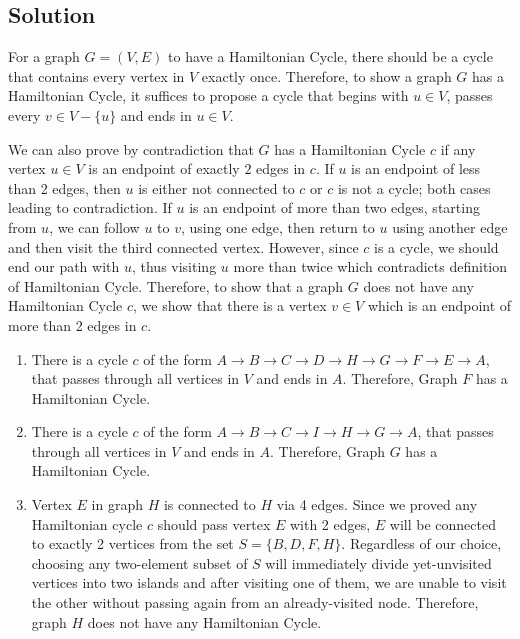 \subsection*{Solution}
For a graph $G = (V,E)$ to have a Hamiltonian Cycle, there should be a cycle that contains every vertex in $V$ exactly once. Therefore, to show a graph $G$ has a Hamiltonian Cycle, it suffices to propose a cycle that begins with $u \in V$, passes every $v \in V-\{u\}$ and ends in $u \in V$.

We can also prove by contradiction that $G$ has a Hamiltonian Cycle $c$ if any vertex $u \in V$ is an endpoint of exactly $2$ edges in $c$. If $u$ is an endpoint of less than 2 edges, then $u$ is either not connected to $c$ or $c$ is not a cycle; both cases leading to contradiction.
If $u$ is an endpoint of more than two edges, starting from $u$, we can follow $u$ to $v$, using one edge, then return to $u$ using another edge and then visit the third connected vertex. However, since $c$ is a cycle, we should end our path with $u$, thus visiting $u$ more than twice which contradicts definition of Hamiltonian Cycle.
Therefore, to show that a graph $G$ does not have any Hamiltonian Cycle $c$, we show that there is a vertex $v \in V$ which is an endpoint of more than 2 edges in $c$.
\begin{enumerate}[label=(\alph*)]
\item There is a cycle $c$ of the form $A \rightarrow B \rightarrow C \rightarrow D \rightarrow H \rightarrow G \rightarrow F \rightarrow E \rightarrow A$, that passes through all vertices in $V$ and ends in $A$. Therefore, Graph $F$ has a Hamiltonian Cycle.
\item There is a cycle $c$ of the form $A \rightarrow B \rightarrow C \rightarrow I \rightarrow H \rightarrow G \rightarrow A$, that passes through all vertices in $V$ and ends in $A$. Therefore, Graph $G$ has a Hamiltonian Cycle.
\item Vertex $E$ in graph $H$ is connected to $H$ via 4 edges. Since we proved any Hamiltonian cycle $c$ should pass vertex $E$ with 2 edges, $E$ will be connected to exactly 2 vertices from the set $S = \{B, D, F, H\}$. Regardless of our choice, choosing any two-element subset of $S$ will immediately divide yet-unvisited vertices into two islands and after visiting one of them, we are unable to visit the other without passing again from an already-visited node. Therefore, graph $H$ does not have any Hamiltonian Cycle.
\end{enumerate}
